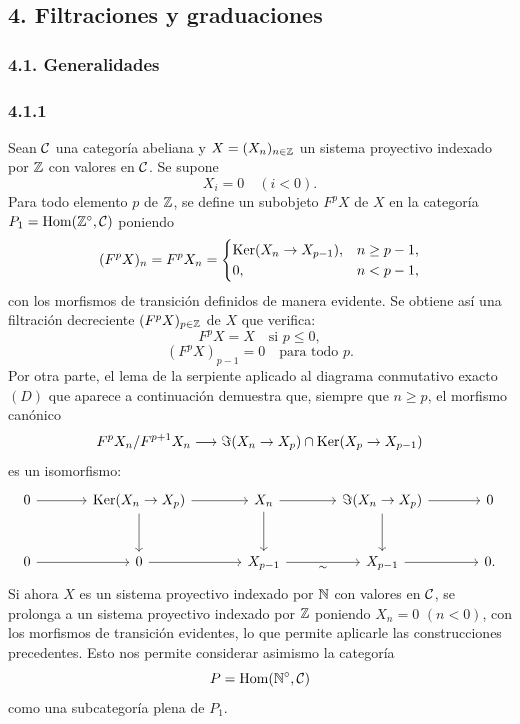 \subsection*{4. Filtraciones y graduaciones}
\subsubsection*{4.1. Generalidades}
\subsubsection*{4.1.1}
Sean $\mathcal C$ una categoría abeliana y $X=(X_n)_{n\in\mathbb Z}$ un sistema proyectivo indexado por $\mathbb Z$ con valores en $\mathcal C$. Se supone
\[
X_i=0\quad(i<0).
\]
Para todo elemento $p$ de $\mathbb Z$, se define un subobjeto $F^pX$ de $X$ en la categoría $P_1=\operatorname{Hom}(\mathbb Z^\circ,\mathcal C)$ poniendo
\[
(F^pX)_n=F^pX_n=
\begin{cases}
\operatorname{Ker}(X_n\to X_{p-1}),& n\ge p-1,\\
0,& n<p-1,
\end{cases}
\]
con los morfismos de transición definidos de manera evidente. Se obtiene así una filtración decreciente $(F^pX)_{p\in\mathbb Z}$ de $X$ que verifica:
\begin{equation}\tag{a}
F^pX=X\quad\text{si }p\le0,
\end{equation}
\begin{equation}\tag{b}
(F^pX)_{p-1}=0\quad\text{para todo }p.
\end{equation}
Por otra parte, el lema de la serpiente aplicado al diagrama conmutativo exacto $(D)$ que aparece a continuación demuestra que, siempre que $n\ge p$, el morfismo canónico
\[
F^pX_n/F^{p+1}X_n\longrightarrow \Im(X_n\to X_p)\cap\operatorname{Ker}(X_p\to X_{p-1})
\]
es un isomorfismo:
\[
\begin{tikzcd}[column sep=large,row sep=large]
0 \arrow[r] & \Ker(X_n\to X_p) \arrow[r] \arrow[d] & X_n \arrow[r] \arrow[d] & \Im(X_n\to X_p) \arrow[r] \arrow[d] & 0\\
0 \arrow[r] & 0 \arrow[r] & X_{p-1} \arrow[r,"\sim"'] & X_{p-1} \arrow[r] & 0 .
\end{tikzcd}
\]
Si ahora $X$ es un sistema proyectivo indexado por $\mathbb N$ con valores en $\mathcal C$, se prolonga a un sistema proyectivo indexado por $\mathbb Z$ poniendo $X_n=0$ $(n<0)$, con los morfismos de transición evidentes, lo que permite aplicarle las construcciones precedentes. Esto nos permite considerar asimismo la categoría
\[
P=\operatorname{Hom}(\mathbb N^\circ,\mathcal C)
\]
como una subcategoría plena de $P_1$.
